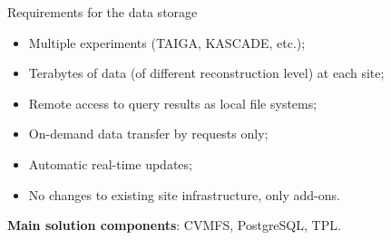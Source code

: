

\begin{frame}{Requirements for the data storage}
  \begin{itemize}
    \item Multiple experiments (TAIGA, KASCADE, etc.);
    \item Terabytes of data (of different reconstruction level) at each site;
    \item Remote access to query results as local file systems;
    \item  On-demand data transfer by requests only;
    \item  Automatic real-time updates;
    \item  No changes to existing site infrastructure, only add-ons.
  \end{itemize}
  \vspace{1em}
  \textbf{Main solution components}: CVMFS, PostgreSQL, TPL.
\end{frame}
